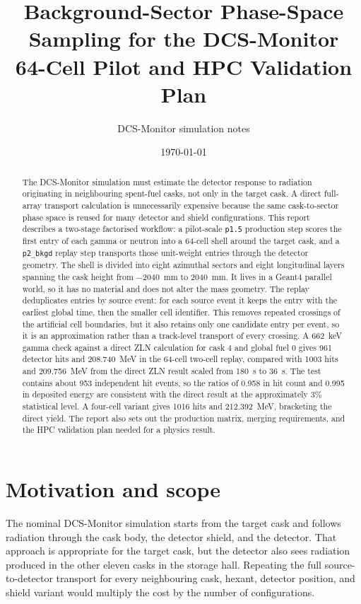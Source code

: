 \documentclass[11pt,a4paper]{article}
\title{Background-Sector Phase-Space Sampling for the DCS-Monitor\\[2pt]
\large 64-Cell Pilot and HPC Validation Plan}
\author{DCS-Monitor simulation notes}
\date{\today}
\begin{document}
\maketitle

\begin{abstract}
The DCS-Monitor simulation must estimate the detector response to radiation
originating in neighbouring spent-fuel casks, not only in the target cask. A
direct full-array transport calculation is unnecessarily expensive because the
same cask-to-sector phase space is reused for many detector and shield
configurations. This report describes a two-stage factorised workflow: a
pilot-scale \texttt{p1.5} production step scores the first entry of each gamma
or neutron into a 64-cell shell around the target cask, and a
\texttt{p2\_bkgd} replay step transports those unit-weight entries through the
detector geometry. The shell is divided into eight azimuthal sectors and eight
longitudinal layers spanning the cask height from \SI{-2040}{mm} to
\SI{+2040}{mm}. It lives in a Geant4 parallel world, so it has no material and
does not alter the mass geometry. The replay deduplicates entries by source
event: for each source event it keeps the entry with the earliest global time,
then the smaller cell identifier. This removes repeated crossings of the
artificial cell boundaries, but it also retains only one candidate entry per
event, so it is an approximation rather than a track-level transport of every
crossing. A \SI{662}{keV} gamma check against a direct ZLN calculation for cask
4 and global fuel 0 gives 961 detector hits and \SI{208.740}{MeV} in the
64-cell two-cell replay, compared with 1003 hits and \SI{209.756}{MeV} from the
direct ZLN result scaled from \SI{180}{s} to \SI{36}{s}. The test contains
about 953 independent hit events, so the ratios of 0.958 in hit count and 0.995
in deposited energy are consistent with the direct result at the approximately
3\% statistical level. A four-cell variant gives 1016 hits and
\SI{212.392}{MeV}, bracketing the direct yield. The report also sets out the
production matrix, merging requirements, and the HPC validation plan needed for
a physics result.
\end{abstract}

\tableofcontents

\section{Motivation and scope}

The nominal DCS-Monitor simulation starts from the target cask and follows
radiation through the cask body, the detector shield, and the detector. That
approach is appropriate for the target cask, but the detector also sees
radiation produced in the other eleven casks in the storage hall. Repeating the
full source-to-detector transport for every neighbouring cask, hexant, detector
position, and shield variant would multiply the cost by the number of
configurations.
\end{document}
